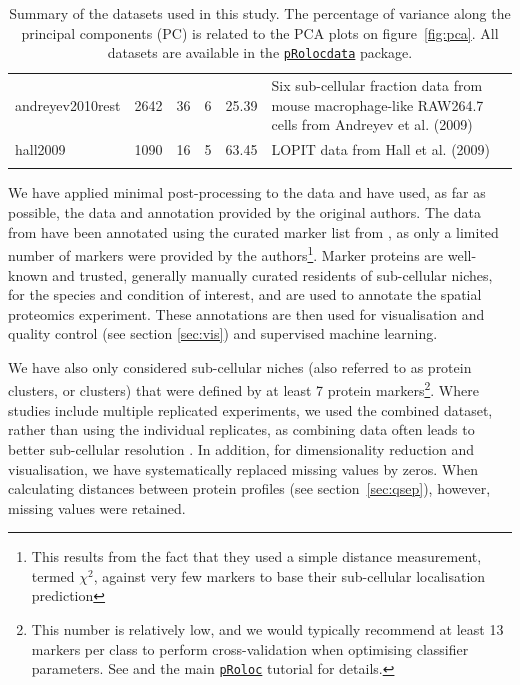 \documentclass[12pt]{article}\usepackage[]{graphicx}\usepackage[]{color}
\newcommand{\Rpackage}[1]{\texttt{#1}}
\newcommand\Biocpkg[1]{%
  {\href{http://bioconductor.org/packages/#1}%
    {\Rpackage{#1}}}}
\newcommand\Biocexptpkg[1]{\Biocpkg{#1}}
\begin{document}
\begin{footnotesize}
\begin{landscape}
\begin{longtable}{lrrrrp{8cm}}
  andreyev2010rest & 2642 &  36 &   6 & 25.39 & Six sub-cellular fraction data from mouse macrophage-like RAW264.7 cells from Andreyev et al. (2009) \citep{Andreyev:2010} \\ 
  hall2009 & 1090 &  16 &   5 & 63.45 & LOPIT data from Hall et al. (2009) \citep{Hall:2009} \\ 
   \bottomrule
\caption{Summary of the datasets used in this study. The percentage of variance along the principal components (PC) is related to the PCA plots on figure~\ref{fig:pca}. All datasets are available in the \Biocexptpkg{pRolocdata} package.} 
\label{tab:pdtab}
\end{longtable}

\end{landscape}
\end{footnotesize}


We have applied minimal post-processing to the data and have used, as
far as possible, the data and annotation provided by the original
authors. The data from \citet{Foster:2006} have been annotated using
the curated marker list from \citet{Christoforou:2016}, as only a
limited number of markers were provided by the authors\footnote{This
  results from the fact that they used a simple distance measurement,
  termed $\chi^2$, against very few markers to base their sub-cellular
  localisation prediction}. Marker proteins are well-known and
trusted, generally manually curated residents of sub-cellular niches,
for the species and condition of interest, and are used to annotate
the spatial proteomics experiment. These annotations are then used for
visualisation and quality control (see section \ref{sec:vis}) and
supervised machine learning.

We have also only considered sub-cellular niches (also referred to as
protein clusters, or clusters) that were defined by at least 7 protein
markers\footnote{This number is relatively low, and we would typically
  recommend at least 13 markers per class to perform cross-validation
  when optimising classifier parameters. See \citet{Gatto:2014} and
  the main \Biocpkg{pRoloc} tutorial for details.}. Where studies
include multiple replicated experiments, we used the combined dataset,
rather than using the individual replicates, as combining data often
leads to better sub-cellular resolution \citep{Trotter:2010}. In
addition, for dimensionality reduction and visualisation, we have
systematically replaced missing values by zeros. When calculating
distances between protein profiles (see section~\ref{sec:qsep}),
however, missing values were retained.
\end{document}
